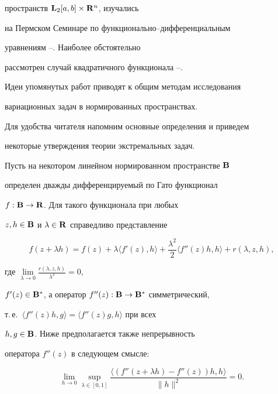 пространств $\bold L{}_2[a,b]\times\bold R{}^n$, изучались


на Пермском Семинаре по функционально--дифференциальным


уравнениям \cite{DM}--\cite{GG}. Наиболее обстоятельно


рассмотрен случай квадратичного функционала \cite{G}--\cite{AR}.


Идеи упомянутых работ приводят к общим методам исследования


вариационных задач в нормированных пространствах.





Для удобства читателя напомним основные определения и приведем


некоторые утверждения теории экстремальных задач.





Пусть на некотором линейном нормированном пространстве $\bold B{}$


определен дважды дифференцируемый по Гато функционал


$f:\bold B{}\to\bold R{}$. Для такого функционала при любых


$z,h\in\bold B{}$ и $\lambda\in\bold R{}$ справедливо представление


\begin{equation}


f(z+\lambda h)=f(z)+\lambda\langle f'(z),h\rangle+\frac{\lambda^2}2


\langle f''(z)h,h\rangle+r(\lambda,z,h),


\tag{0.1}


\end{equation}


где $\lim\limits_{\lambda\to0}\frac{r(\lambda,z,h)}{\lambda^2}=0$,


$f'(z)\in\bold B{}^*$, а оператор $f''(z):\bold B{}\to\bold B{}^*$ симметрический,


т.\,е.~$\langle f''(z)h,g\rangle=\langle f''(z)g,h\rangle$ при всех


$h,g\in\bold B{}$. Ниже предполагается также непрерывность


оператора $f''(z)$ в следующем смысле:


\begin{equation}


\lim_{h\to0}\sup_{\lambda\in[0,1]}\frac


{\langle(f''(z+\lambda h)-f''(z))h,h\rangle}{\|h\|^2}=0.\tag{0.2}


\end{equation}





